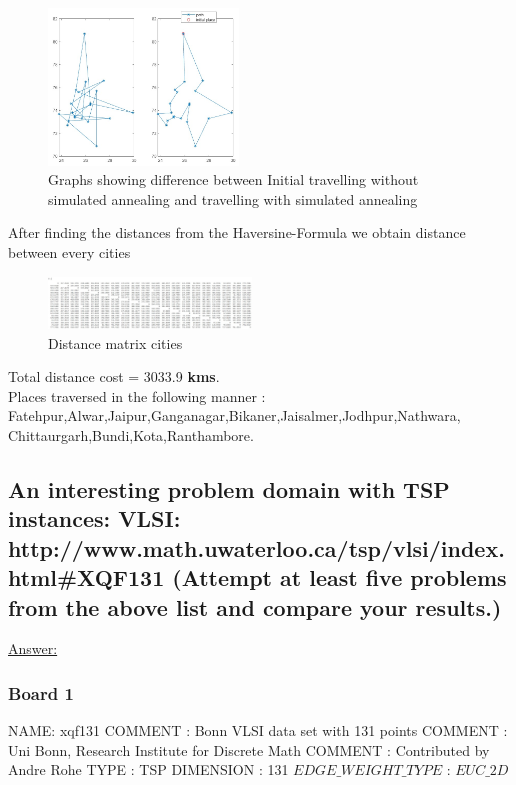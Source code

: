 \documentclass[15pt,journal]{IEEEtran}
\begin{document}
\begin{figure}[H]%
\begin {center}
\includegraphics[width=0.45\textwidth]{images/tsp.jpeg}
\caption{ Graphs showing difference between Initial travelling without simulated annealing and travelling with simulated annealing } 
\label{fig:ecg}
\end {center}
\end{figure}

After finding the distances from the Haversine-Formula we obtain distance between every cities


\begin{figure}[H]%
\begin {center}
\includegraphics[width=0.48\textwidth]{images/tsp2.jpeg}
\caption{Distance  matrix  cities} %
\label{fig:ecg}
\end {center}
\end{figure}

Total distance cost = 3033.9 {\bf{kms}}.\\
Places traversed in the following manner : \\ Fatehpur,Alwar,Jaipur,Ganganagar,Bikaner,Jaisalmer,Jodhpur,Nathwara,
Chittaurgarh,Bundi,Kota,Ranthambore.



\subsection{An interesting problem domain with TSP instances:
VLSI: http://www.math.uwaterloo.ca/tsp/vlsi/index.html\#XQF131
(Attempt at least five problems from the above list and compare your results.)
}

\underline{Answer:} 
\subsubsection{\bf{Board 1}}
NAME: xqf131
COMMENT : Bonn VLSI data set with 131 points
COMMENT : Uni Bonn, Research Institute for Discrete Math
COMMENT : Contributed by Andre Rohe
TYPE : TSP
DIMENSION : 131
$EDGE\_WEIGHT\_TYPE$ : $EUC\_2D$
\end{document}
